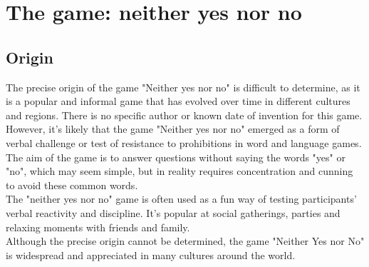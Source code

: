 \section{The game: neither yes nor no}
\subsection{Origin}
The precise origin of the game "Neither yes nor no" is difficult to determine, as it is a popular and informal game that has evolved over time in different cultures and regions. There is no specific author or known date of invention for this game.\\
However, it's likely that the game "Neither yes nor no" emerged as a form of verbal challenge or test of resistance to prohibitions in word and language games. The aim of the game is to answer questions without saying the words "yes" or "no", which may seem simple, but in reality requires concentration and cunning to avoid these common words.\\
The "neither yes nor no" game is often used as a fun way of testing participants' verbal reactivity and discipline. It's popular at social gatherings, parties and relaxing moments with friends and family.\\
Although the precise origin cannot be determined, the game "Neither Yes nor No" is widespread and appreciated in many cultures around the world.\\

